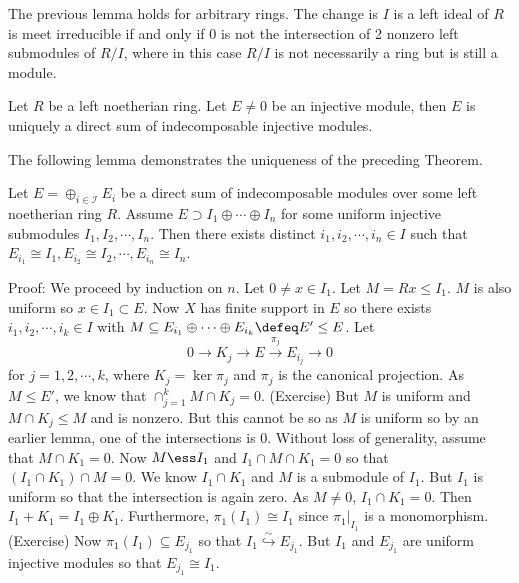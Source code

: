 \begin{rem}
The previous lemma holds for arbitrary rings. The change is $I$ is a left ideal of $R$ is meet irreducible if and only if 0 is not the intersection of 2 nonzero left submodules of $R/I$, where in this case $R/I$ is not necessarily a ring but is still a module.
\end{rem}

\begin{thm}
Let $R$ be a left noetherian ring. Let $E \neq 0$ be an injective module, then $E$ is uniquely a direct sum of indecomposable injective modules. 
\end{thm}

The following lemma demonstrates the uniqueness of the preceding Theorem. 

\begin{lem}
Let $E=\oplus_{i \in \mathcal{I}} E_i$ be a direct sum of indecomposable modules over some left noetherian ring $R$. Assume $E \supset I_1 \oplus \cdots \oplus I_n$ for some uniform injective submodules $I_1,I_2,\cdots,I_n$. Then there exists distinct $i_1,i_2,\cdots,i_n \in I$ such that $E_{i_1} \cong I_1,E_{i_2} \cong I_2,\cdots,E_{i_n} \cong I_n$. 
\end{lem}

Proof: We proceed by induction on $n$. Let $0 \neq x \in I_1$. Let $M=Rx \leq I_1$. $M$ is also uniform so $x \in I_1 \subset E$. Now $X$ has finite support in $E$ so there exists $i_1,i_2,\cdots,i_k \in I$ with $M \subseteq E_{i_1}\oplus \cdots \oplus E_{i_k} \defeq E' \leq E$. Let
\[
0 \longrightarrow K_j \longrightarrow E \stackrel{\pi_j}{\longrightarrow} E_{i_j} \longrightarrow 0
\]
for $j=1,2,\cdots,k$, where $K_j=\ker \pi_j$ and $\pi_j$ is the canonical projection. As $M \leq E'$, we know that $\cap_{j=1}^k M \cap K_j=0$. (Exercise) But $M$ is uniform and $M \cap K_j \leq M$ and is nonzero. But this cannot be so as $M$ is uniform so by an earlier lemma, one of the intersections is 0. Without loss of generality, assume that $M \cap K_1=0$. Now $M \ess I_1$ and $I_1 \cap M \cap K_1=0$ so that $(I_1 \cap K_1) \cap M=0$. We know $I_1 \cap K_1$ and $M$ is a submodule of $I_1$. But $I_1$ is uniform so that the intersection is again zero. As $M \neq 0$, $I_1 \cap K_1=0$. Then $I_1+K_1=I_1 \oplus K_1$. Furthermore, $\pi_1(I_1) \cong I_1$ since $\pi_1|_{I_1}$ is a monomorphism. (Exercise) Now $\pi_1(I_1) \subseteq E_{j_1}$ so that $I_1 \stackrel{\sim}{\hookrightarrow} E_{j_1}$. But $I_1$ and $E_{j_1}$ are uniform injective modules so that $E_{j_1} \cong I_1$. 

